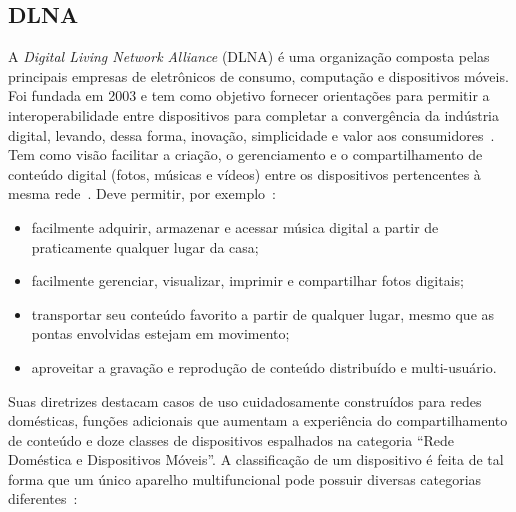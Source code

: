 \subsection{DLNA}

A \emph{Digital Living Network Alliance} (DLNA) é uma organização composta pelas principais empresas de eletrônicos de consumo, computação e dispositivos móveis. Foi fundada em 2003 e tem como objetivo fornecer orientações para permitir a interoperabilidade entre dispositivos para completar a convergência da indústria digital, levando, dessa forma, inovação, simplicidade e valor aos consumidores~\cite{dlnaoverview}. Tem como visão facilitar a criação, o gerenciamento e o compartilhamento de conteúdo digital (fotos, músicas e vídeos) entre os dispositivos pertencentes à mesma rede~\cite{dlnahdvideostreaming}. Deve permitir, por exemplo~\cite{dlnaoverview}:

\begin{itemize}
	\item facilmente adquirir, armazenar e acessar música digital a partir de praticamente qualquer lugar da casa;
	\item facilmente gerenciar, visualizar, imprimir e compartilhar fotos digitais;
	\item transportar seu conteúdo favorito a partir de qualquer lugar, mesmo que as pontas envolvidas estejam em movimento;
	\item aproveitar a gravação e reprodução de conteúdo distribuído e multi-usuário.
\end{itemize}

Suas diretrizes destacam casos de uso cuidadosamente construídos para redes domésticas, funções adicionais que aumentam a experiência do compartilhamento de conteúdo e doze classes de dispositivos espalhados na categoria ``Rede Doméstica e Dispositivos Móveis''. A classificação de um dispositivo é feita de tal forma que um único aparelho multifuncional pode possuir diversas categorias diferentes~\cite{dlnahdvideostreaming, dlnaclasses}:

